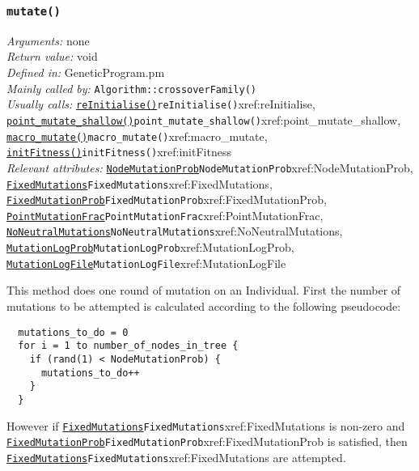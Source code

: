 \documentclass[a4paper]{article}
\begin{document}
\subsubsection{\texttt{mutate()}}\label{xref:mutate}
\begin{flushleft}
\textit{Arguments:} none\\
\textit{Return value:} void\\
\textit{Defined in:} GeneticProgram.pm\\
\textit{Mainly called by:} \texttt{Algorithm::crossoverFamily()}\\
\textit{Usually calls:} \hyperref[no]{\texttt{reInitialise()}}{\texttt{reInitialise()}}{xref:reInitialise}, \hyperref[no]{\texttt{point\_mutate\_shallow()}}{\texttt{point\_mutate\_shallow()}}{xref:point_mutate_shallow}, \hyperref[no]{\texttt{macro\_mutate()}}{\texttt{macro\_mutate()}}{xref:macro_mutate}, \hyperref[no]{\texttt{initFitness()}}{\texttt{initFitness()}}{xref:initFitness}\\
\textit{Relevant attributes:} \hyperref[no]{\texttt{NodeMutationProb}}{\texttt{NodeMutationProb}}{xref:NodeMutationProb}, \hyperref[no]{\texttt{FixedMutations}}{\texttt{FixedMutations}}{xref:FixedMutations}, \hyperref[no]{\texttt{FixedMutationProb}}{\texttt{FixedMutationProb}}{xref:FixedMutationProb}, \hyperref[no]{\texttt{PointMutationFrac}}{\texttt{PointMutationFrac}}{xref:PointMutationFrac}, \hyperref[no]{\texttt{NoNeutralMutations}}{\texttt{NoNeutralMutations}}{xref:NoNeutralMutations}, \hyperref[no]{\texttt{MutationLogProb}}{\texttt{MutationLogProb}}{xref:MutationLogProb}, \hyperref[no]{\texttt{MutationLogFile}}{\texttt{MutationLogFile}}{xref:MutationLogFile}
\end{flushleft}

This method does one round of mutation on an Individual.  First the
number of mutations to be attempted is
calculated according to the following pseudocode:

\begin{verbatim}
  mutations_to_do = 0
  for i = 1 to number_of_nodes_in_tree {
    if (rand(1) < NodeMutationProb) {
      mutations_to_do++
    }
  }
\end{verbatim}

However if \hyperref[no]{\texttt{FixedMutations}}{\texttt{FixedMutations}}{xref:FixedMutations} is non-zero and
\hyperref[no]{\texttt{FixedMutationProb}}{\texttt{FixedMutationProb}}{xref:FixedMutationProb} is satisfied, then \hyperref[no]{\texttt{FixedMutations}}{\texttt{FixedMutations}}{xref:FixedMutations}
are attempted.
\end{document}
